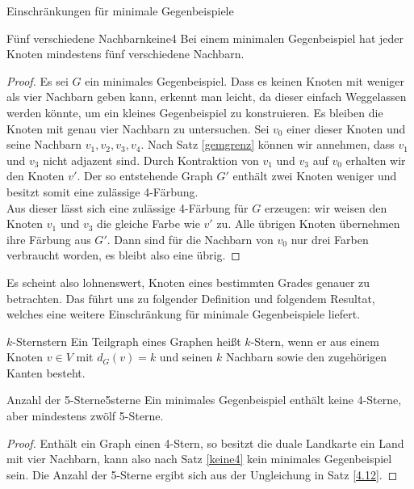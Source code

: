 \begin{section}{Einschränkungen für minimale Gegenbeispiele}
 \begin{satzl}{Fünf verschiedene Nachbarn}{keine4}
  Bei einem minimalen Gegenbeispiel hat jeder Knoten mindestens fünf verschiedene Nachbarn.
 \end{satzl}
 \begin{proof}
  Es sei $G$ ein minimales Gegenbeispiel. Dass es keinen Knoten mit weniger als vier Nachbarn geben kann, erkennt man leicht, da dieser einfach Weggelassen werden könnte, um ein kleines Gegenbeispiel zu konstruieren. Es bleiben die Knoten mit genau vier Nachbarn zu untersuchen. Sei $v_0$ einer dieser Knoten und seine Nachbarn $v_1,v_2,v_3,v_4$. Nach Satz \ref{gemgrenz} können wir annehmen, dass $v_1$ und $v_3$ nicht adjazent sind. Durch Kontraktion von $v_1$ und $v_3$ auf $v_0$ erhalten wir den Knoten $v'$. Der so entstehende Graph $G'$ enthält zwei Knoten weniger und besitzt somit eine zulässige 4-Färbung.\\
  Aus dieser lässt sich eine zulässige 4-Färbung für $G$ erzeugen: wir weisen den Knoten $v_1$ und $v_3$ die gleiche Farbe wie $v'$ zu. Alle übrigen Knoten übernehmen ihre Färbung aus $G'$. Dann sind für die Nachbarn von $v_0$ nur drei Farben verbraucht worden, es bleibt also eine übrig.
 \end{proof}
 
 Es scheint also lohnenswert, Knoten eines bestimmten Grades genauer zu betrachten. Das führt uns zu folgender Definition und folgendem Resultat, welches eine weitere Einschränkung für minimale Gegenbeispiele liefert.
 
 \begin{definitionl}{$k$-Stern}{stern}
  Ein Teilgraph eines Graphen heißt $k$-Stern, wenn er aus einem Knoten $v \in V$ mit $d_G(v) = k$ und seinen $k$ Nachbarn sowie den zugehörigen Kanten besteht.
 \end{definitionl}
 
 \begin{satzl}{Anzahl der 5-Sterne}{5sterne}
  Ein minimales Gegenbeispiel enthält keine 4-Sterne, aber mindestens zwölf 5-Sterne.
 \end{satzl}
 \begin{proof}
  Enthält ein Graph einen 4-Stern, so besitzt die duale Landkarte ein Land mit vier Nachbarn, kann also nach Satz \ref{keine4} kein minimales Gegenbeispiel sein. Die Anzahl der 5-Sterne ergibt sich aus der Ungleichung in Satz \ref{4.12}.
 \end{proof}
\end{section}